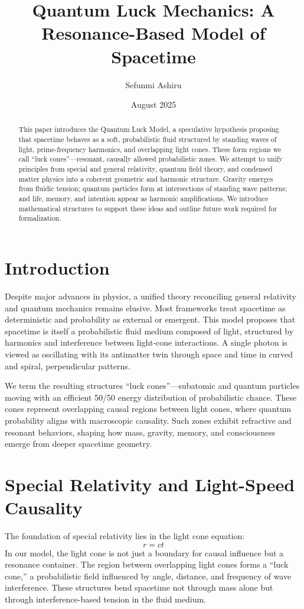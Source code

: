 \documentclass[12pt]{article}
\title{Quantum Luck Mechanics: A Resonance-Based Model of Spacetime}
\author{Sefunmi Ashiru}
\date{August 2025}
\begin{document}
\maketitle

\begin{abstract}
This paper introduces the Quantum Luck Model, a speculative hypothesis proposing that spacetime behaves as a soft, probabilistic fluid structured by standing waves of light, prime-frequency harmonics, and overlapping light cones. These form regions we call ``luck cones''---resonant, causally allowed probabilistic zones. We attempt to unify principles from special and general relativity, quantum field theory, and condensed matter physics into a coherent geometric and harmonic structure. Gravity emerges from fluidic tension; quantum particles form at intersections of standing wave patterns; and life, memory, and intention appear as harmonic amplifications. We introduce mathematical structures to support these ideas and outline future work required for formalization.
\end{abstract}

\section{Introduction}
Despite major advances in physics, a unified theory reconciling general relativity and quantum mechanics remains elusive. Most frameworks treat spacetime as deterministic and probability as external or emergent. This model proposes that spacetime is itself a probabilistic fluid medium composed of light, structured by harmonics and interference between light-cone interactions. A single photon is viewed as oscillating with its antimatter twin through space and time in curved and spiral, perpendicular patterns.

We term the resulting structures ``luck cones''---subatomic and quantum particles moving with an efficient 50/50 energy distribution of probabilistic chance. These cones represent overlapping causal regions between light cones, where quantum probability aligns with macroscopic causality. Such zones exhibit refractive and resonant behaviors, shaping how mass, gravity, memory, and consciousness emerge from deeper spacetime geometry.

\section{Special Relativity and Light-Speed Causality}
The foundation of special relativity lies in the light cone equation:
\begin{equation}
 r = ct
\end{equation}
In our model, the light cone is not just a boundary for causal influence but a resonance container. The region between overlapping light cones forms a ``luck cone,'' a probabilistic field influenced by angle, distance, and frequency of wave interference. These structures bend spacetime not through mass alone but through interference-based tension in the fluid medium.
\end{document}
